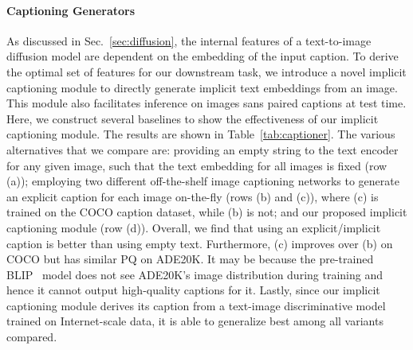 \documentclass[10pt,twocolumn,letterpaper]{article}
\begin{document}
\paragraph{Captioning Generators}
As discussed in Sec.~\ref{sec:diffusion}, the internal features of a text-to-image diffusion model are dependent on the embedding of the input caption. 
To derive the optimal set of features for our downstream task, we introduce a novel implicit captioning module to directly generate implicit text embeddings from an image. 
This module also facilitates inference on images sans paired captions at test time.
Here, we construct several baselines to show the effectiveness of our implicit captioning module.
The results are shown in Table~\ref{tab:captioner}. 
The various alternatives that we compare are: providing an empty string to the text encoder for any given image, such that the text embedding for all images is fixed (row (a)); employing two different off-the-shelf image captioning networks to generate an explicit caption for each image on-the-fly (rows (b) and (c)), where (c)\cite{li2022blip} is trained on the COCO caption dataset, while (b)\cite{zeng2022socratic} is not; and our proposed implicit captioning module (row (d)). Overall, we find that using an explicit/implicit caption is better than using empty text. Furthermore, (c) improves over (b) on COCO but has similar PQ on ADE20K. 
It may be because the pre-trained BLIP~\cite{li2022blip} model does not see ADE20K's image distribution during training and hence it cannot output high-quality captions for it. 
Lastly, since our implicit captioning module derives its caption from a text-image discriminative model trained on Internet-scale data, it is able to generalize best among all variants compared.
\end{document}
